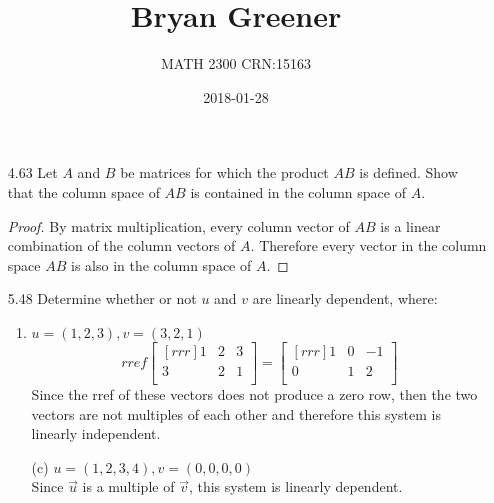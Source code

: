 \documentclass[12pt]{article}
\title{Bryan Greener}
\author{MATH 2300 CRN:15163}
\date{2018-01-28}
\begin{document}
\maketitle

\TabPositions{4cm}

\begin{enumerate}
\item[4.63] Let $A$ and $B$ be matrices for which the product $AB$ is defined. Show that the column space of $AB$ is contained in the column space of $A$.
	\begin{proof}
	By matrix multiplication, every column vector of $AB$ is a linear combination of the column vectors of $A$. Therefore every vector in the column space $AB$ is also in the column space of $A$.
	\end{proof}
\item[5.48] Determine whether or not $u$ and $v$ are linearly dependent, where:
	\begin{enumerate}
	\item $u=(1,2,3),v=(3,2,1)$\\
		\[ rref\begin{bmatrix}[rrr]1&2&3\\3&2&1\\\end{bmatrix} =
		\begin{bmatrix}[rrr]1&0&-1\\0&1&2\\\end{bmatrix} \]
		Since the rref of these vectors does not produce a zero row, then the two vectors are not multiples of each other and therefore this system is linearly independent.
	\item[(c)] $u=(1,2,3,4),v=(0,0,0,0)$\\
		Since $\vec{u}$ is a multiple of $\vec{v}$, this system is linearly dependent.
	\end{enumerate}
	

\end{enumerate}
\end{document}
